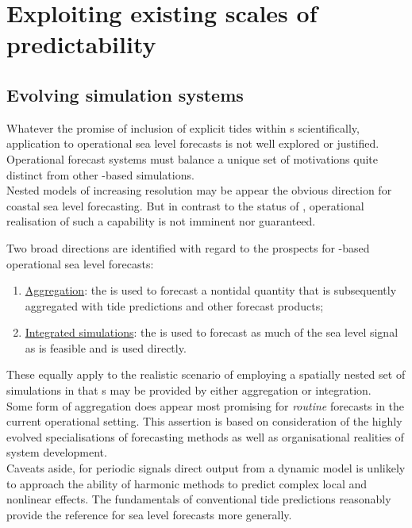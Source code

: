 \section{Exploiting existing scales of predictability}
\label{S:fc_prospects}


\subsection{Evolving simulation systems}

Whatever the promise of inclusion of explicit tides within \OGCM{}s scientifically, application to operational sea level forecasts is not well explored or justified.
Operational forecast systems must balance a unique set of motivations quite distinct from other \OGCM{}-based simulations.  \\
Nested models of increasing resolution may be appear the obvious direction for coastal sea level forecasting.  But in contrast to the status of \BL{}, operational realisation of such a capability is not imminent nor guaranteed.


Two broad directions are identified with regard to the prospects for \OGCM{}-based operational sea level forecasts:
\begin{enumerate}
\item \underline{Aggregation}: the \OGCM{} is used to forecast a nontidal quantity that is subsequently aggregated with tide predictions and other forecast products;
\item \underline{Integrated simulations}: the \OGCM{} is used to forecast as much of the sea level signal as is feasible and is used directly.
\end{enumerate}
These equally apply to the realistic scenario of employing a spatially nested set of simulations in that \obc{}s may be provided by either aggregation or integration.\\


Some form of aggregation does appear most promising for \emph{routine} forecasts in the current operational setting.  
This assertion is based on consideration of the highly evolved specialisations of forecasting methods as well as organisational realities of system development.\\
Caveats aside, for periodic signals direct output from a dynamic model is unlikely to approach the ability of harmonic methods to predict complex local and nonlinear effects.   The fundamentals of conventional tide predictions reasonably provide the reference for sea level forecasts more generally. \\



